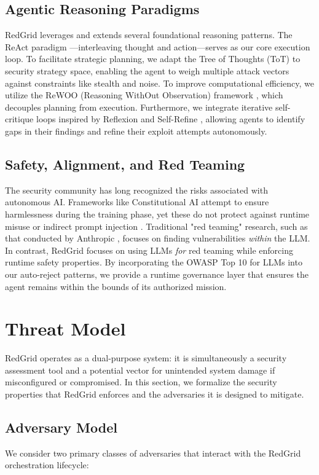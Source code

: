 \documentclass[conference,compsoc]{IEEEtran}
\begin{document}
\subsection{Agentic Reasoning Paradigms}
RedGrid leverages and extends several foundational reasoning patterns. The ReAct paradigm \cite{react}---interleaving thought and action---serves as our core execution loop. To facilitate strategic planning, we adapt the Tree of Thoughts (ToT) \cite{tot} to security strategy space, enabling the agent to weigh multiple attack vectors against constraints like stealth and noise. To improve computational efficiency, we utilize the ReWOO (Reasoning WithOut Observation) framework \cite{rewoo}, which decouples planning from execution. Furthermore, we integrate iterative self-critique loops inspired by Reflexion \cite{reflexion} and Self-Refine \cite{selfrefine}, allowing agents to identify gaps in their findings and refine their exploit attempts autonomously.

\subsection{Safety, Alignment, and Red Teaming}
The security community has long recognized the risks associated with autonomous AI. Frameworks like Constitutional AI \cite{constitutionalai} attempt to ensure harmlessness during the training phase, yet these do not protect against runtime misuse or indirect prompt injection \cite{greshake}. Traditional "red teaming" research, such as that conducted by Anthropic \cite{ganguli2022red, perez2022red}, focuses on finding vulnerabilities \textit{within} the LLM. In contrast, RedGrid focuses on using LLMs \textit{for} red teaming while enforcing runtime safety properties. By incorporating the OWASP Top 10 for LLMs \cite{owaspllm} into our auto-reject patterns, we provide a runtime governance layer that ensures the agent remains within the bounds of its authorized mission.

\section{Threat Model} \label{sec:threat}
RedGrid operates as a dual-purpose system: it is simultaneously a security assessment tool and a potential vector for unintended system damage if misconfigured or compromised. In this section, we formalize the security properties that RedGrid enforces and the adversaries it is designed to mitigate.

\subsection{Adversary Model}
We consider two primary classes of adversaries that interact with the RedGrid orchestration lifecycle:
\end{document}
